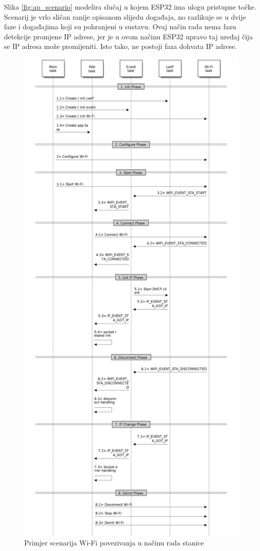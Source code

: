 Slika \ref{fig:ap_scenario} modelira slučaj u kojem ESP32 ima ulogu pristupne točke. Scenarij je vrlo sličan ranije opisanom slijedu događaja, no razlikuje se u dvije faze i događajima koji su pohranjeni u sustavu. Ovaj način rada nema fazu detekcije promjene IP adrese, jer je u ovom načinu ESP32 upravo taj uređaj čija se IP adresa može promijeniti. Isto tako, ne postoji faza dohvata IP adrese. 

\begin{figure}[ht]
	\centering
	\includegraphics[scale=0.3]{imgs/station_scenario}
	\caption{Primjer scenarija Wi-Fi povezivanja u načinu rada stanice \cite{espressif}}
	\label{fig:station_scenario}
\end{figure}

